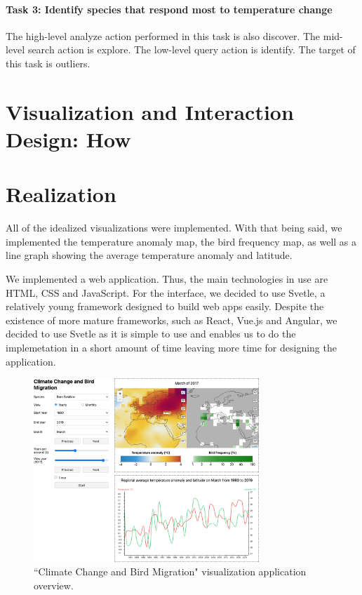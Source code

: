 \documentclass[journal]{vgtc}                %
\begin{document}
\paragraph{Task 3: Identify species that respond most to temperature change} The high-level analyze action performed in this task is also discover. The mid-level search action is explore. The low-level query action is identify. The target of this task is outliers.

\section{Visualization and Interaction Design: How}


\section{Realization}

All of the idealized visualizations were implemented. With that being said, we implemented the temperature anomaly map, the bird frequency map, as well as a line graph showing the average temperature anomaly and latitude.

We implemented a web application. Thus, the main technologies in use are HTML, CSS and JavaScript. For the interface, we decided to use Svetle\cite{svetle}, a relatively young framework designed to build web apps easily. Despite the existence of more mature frameworks, such as React, Vue.js and Angular, we decided to use Svetle as it is simple to use and enables us to do the implemetation in a short amount of time leaving more time for designing the application.

\begin{figure}[h]
  \centering
  \includegraphics[width=85mm]{app-example.png}
  \caption{``Climate Change and Bird Migration" visualization application overview.}
  \label{fig:app-example}
\end{figure}
\end{document}

